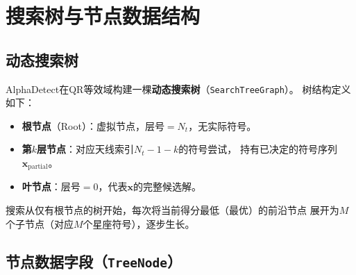 \documentclass[12pt, a4paper]{ctexart}
\begin{document}
\section{搜索树与节点数据结构}

\subsection{动态搜索树}

AlphaDetect在QR等效域构建一棵\textbf{动态搜索树}（\texttt{SearchTreeGraph}）。
树结构定义如下：
\begin{itemize}[leftmargin=2em]
  \item \textbf{根节点}（Root）：虚拟节点，层号$=N_t$，无实际符号。
  \item \textbf{第$k$层节点}：对应天线索引$N_t-1-k$的符号尝试，
        持有已决定的符号序列$\mathbf{x}_{\mathrm{partial}}$。
  \item \textbf{叶节点}：层号$=0$，代表$\mathbf{x}$的完整候选解。
\end{itemize}
搜索从仅有根节点的树开始，每次将当前得分最低（最优）的前沿节点
展开为$M$个子节点（对应$M$个星座符号），逐步生长。

\subsection{节点数据字段（\texttt{TreeNode}）}
\end{document}
